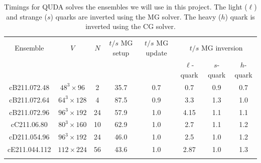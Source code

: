 \begin{table}%
	\centering %
	\begin{tabular}{cccccccc} %
		\toprule
		Ensemble      & $V$             & $N$ & $t/s$ MG setup & $t/s$ MG update & \multicolumn{3}{c}{$t/s$ MG inversion}                         \\
		              &                 &     &                &                 & $\ell$-quark                           & $s$-quark & $h$-quark \\
		\midrule
		\midrule
		cB211.072.48  & $48^3\times96$  & 2   & 35.7           & 0.7             & 0.7                                    & 0.9       & 0.7       \\
		cB211.072.64  & $64^3\times128$ & 4   & 87.5           & 0.9             & 3.3                                    & 1.3       & 1.0       \\
		cB211.072.96  & $96^3\times192$ & 24  & 57.9           & 1.0             & 4.15                                   & 1.1       & 1.1       \\
		\midrule
		cC211.06.80   & $80^3\times160$ & 10  & 62.9           & 1.0             & 2.7                                    & 1.1       & 1.2       \\
		\midrule
		cD211.054.96  & $96^3\times192$ & 24  & 46.0           & 1.0             & 2.5                                    & 1.0       & 1.2       \\
		\midrule
		cE211.044.112 & $112\times224$  & 56  & 43.6           & 1.0             & 2.87                                   & 1.0       & 1.3      \\
		\bottomrule   &
	\end{tabular}
	\caption{Timings for QUDA solves the ensembles we will use in this project.
		The light ($\ell$) and strange ($s$) quarks are inverted using the MG solver.
		The heavy ($h$) quark is inverted using the CG solver.
	}
	\label{tab:MGsolver}
\end{table}

